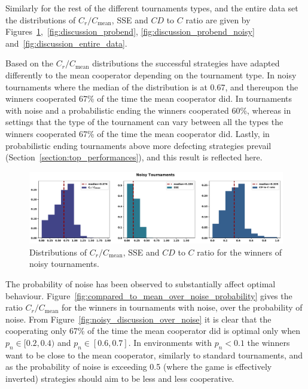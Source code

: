 Similarly for the rest of the different tournaments types, and the entire data
set the distributions of \(C_r / C_{\text{mean}}\), SSE and \(CD\) to \(C\) ratio
are given by Figures~\ref{fig:discussion_noisy},~\ref{fig:discussion_probend},
\ref{fig:discussion_probend_noisy} and~\ref{fig:discussion_entire_data}.

Based on the \(C_r / C_{\text{mean}}\) distributions the successful strategies
have adapted differently to the mean cooperator depending on the tournament
type. In noisy tournaments where the median of the distribution is at 0.67, and
thereupon the winners cooperated 67\% of the time the mean cooperator did. In
tournaments with noise and a probabilistic ending the winners cooperated 60\%,
whereas in settings that the type of the tournament can vary between all the
types the winners cooperated 67\% of the time the mean cooperator did. Lastly,
in probabilistic ending tournaments above more defecting
strategies prevail (Section~\ref{section:top_performances}), and this result is
reflected here.

\begin{figure}[!htbp]
    \centering
        \centering
        \includegraphics[width=\textwidth]{../images/noisy_discussion.pdf}
        \caption{Distributions of \(C_r / C_{\text{mean}}\), SSE and \(CD\) to \(C\) ratio
        for the winners of noisy tournaments.}
        \label{fig:discussion_noisy}
\end{figure}

The probability of noise has been observed to substantially affect optimal
behaviour.
Figure~\ref{fig:compared_to_mean_over_noise_probability} gives the ratio \(C_r /
C_{\text{mean}}\) for the winners in tournaments with noise, over the
probability of noise. From Figure~\ref{fig:noisy_discussion_over_noise} it is
clear that the cooperating only 67\% of the time the mean cooperator did is
optimal only when \(p_n \in [0.2, 0.4)\) and \(p_n \in [0.6, 0.7]\). In
environments with \(p_n < 0.1\) the winners want to be close to the mean
cooperator, similarly to standard tournaments, and as the probability of noise
is exceeding 0.5 (where the game is effectively inverted) strategies should
aim to be less and less cooperative.

